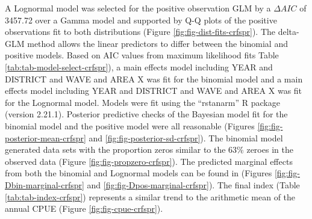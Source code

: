 \documentclass[
]{article}
\begin{document}
A Lognormal model was
selected for the positive observation GLM by
a \(\Delta AIC\) of 3457.72 over a Gamma model and supported by Q-Q plots of the positive observations fit to both distributions (Figure \ref{fig:fig-dist-fits-crfspr}). The delta-GLM
method allows the linear predictors to differ between the binomial and positive models.
Based on AIC values from maximum likelihood fits Table \ref{tab:tab-model-select-crfspr}),
a main effects model including
YEAR and DISTRICT and WAVE and AREA X
was fit for the binomial model and a main
effects model including
YEAR and DISTRICT and WAVE and AREA X
was fit for the Lognormal model.
Models were fit using the ``rstanarm'' R package (version 2.21.1). Posterior predictive
checks of the Bayesian model fit for the binomial model and the positive model
were all reasonable (Figures \ref{fig:fig-posterior-mean-crfspr} and
\ref{fig:fig-posterior-sd-crfspr}). The binomial model generated data sets with the
proportion zeros similar to the 63\% zeroes in the observed data
(Figure \ref{fig:fig-propzero-crfspr}). The predicted marginal effects from
both the binomial and Lognormal models can be found in (Figures \ref{fig:fig-Dbin-marginal-crfspr} and \ref{fig:fig-Dpos-marginal-crfspr}). The
final index (Table \ref{tab:tab-index-crfspr})
represents a similar trend to the arithmetic mean of the annual CPUE (Figure \ref{fig:fig-cpue-crfspr}).

\FloatBarrier
\end{document}
